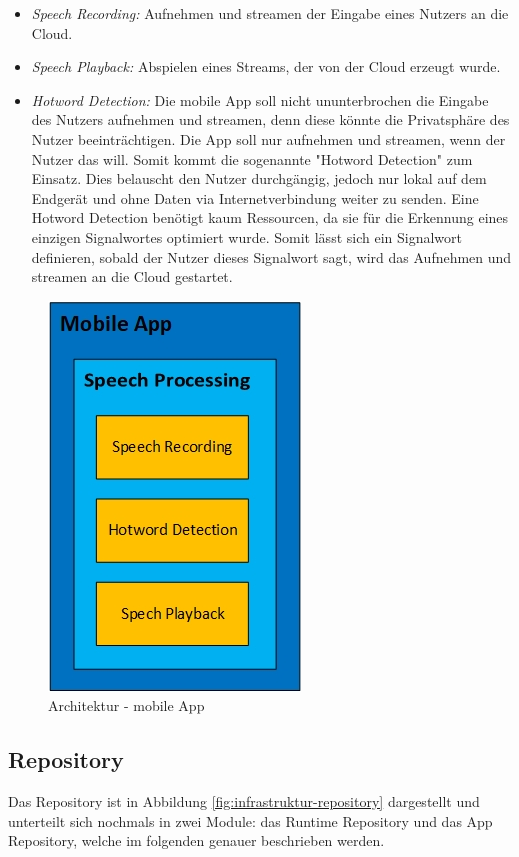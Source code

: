 \begin{itemize}
	\item \textsl{Speech Recording:} Aufnehmen und streamen der Eingabe eines Nutzers an die Cloud.
	\item \textsl{Speech Playback:} Abspielen eines Streams, der von der Cloud erzeugt wurde.
	\item \textsl{Hotword Detection:} Die mobile App soll nicht ununterbrochen die Eingabe des Nutzers aufnehmen und streamen, denn diese könnte die Privatsphäre des Nutzer beeinträchtigen. Die App soll nur aufnehmen und streamen, wenn der Nutzer das will. Somit kommt die sogenannte "Hotword Detection" zum Einsatz. Dies belauscht den Nutzer durchgängig, jedoch nur lokal auf dem Endgerät und ohne Daten via Internetverbindung weiter zu senden. Eine Hotword Detection benötigt kaum Ressourcen, da sie für die Erkennung eines einzigen Signalwortes optimiert wurde. Somit lässt sich ein Signalwort definieren, sobald der Nutzer dieses Signalwort sagt, wird das Aufnehmen und streamen an die Cloud gestartet.
\end{itemize}

\begin{figure}[h!]
	\centering
	\includegraphics[width=0.3\linewidth]{Picture/Infrastruktur-App.jpg}
	\caption[Architektur - mobile App]{Architektur - mobile App}
	\label{fig:infrastruktur-app}
\end{figure}

\subsection{Repository}
Das Repository ist in Abbildung \ref{fig:infrastruktur-repository} dargestellt und unterteilt sich nochmals in zwei Module: das Runtime Repository und das App Repository, welche im folgenden genauer beschrieben werden.

